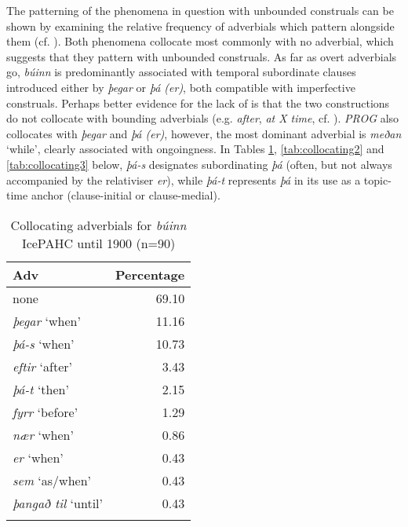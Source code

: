 \documentclass[output=paper,colorlinks,citecolor=brown]{langscibook}
\begin{document}
The patterning of the phenomena in question with unbounded construals can be shown by examining the relative frequency of adverbials which pattern alongside them (cf. \citeauthor{petre2010functions} \citeyear{petre2010functions}). Both phenomena collocate most commonly with no adverbial, which suggests that they pattern with unbounded construals. As far as overt adverbials go, \textit{búinn} is predominantly associated with temporal subordinate clauses introduced either by \textit{þegar} or \textit{þá (er)}, both compatible with imperfective construals. Perhaps better evidence for the lack of  is that the two constructions do not collocate with bounding adverbials (e.g. \textit{after}, \textit{at X time}, cf. \cite[474]{petre2010functions}). \textit{PROG} also collocates with  \textit{þegar} and \textit{þá (er)}, however, the most dominant adverbial is \textit{meðan} `while', clearly associated with ongoingness. In Tables \ref{tab:collocating1}, \ref{tab:collocating2} and \ref{tab:collocating3} below, \textit{þá-s} designates subordinating \textit{þá} (often, but not always accompanied by the relativiser \textit{er}), while \textit{þá-t} represents \textit{þá} in its use as a topic-time anchor (clause-initial or clause-medial).

\begin{table}
    \centering
    \caption{Collocating adverbials for \textit{búinn} IcePAHC until 1900 (n=90)}
    \label{tab:collocating1}
    \begin{tabularx}{0.48\textwidth}{>{\raggedright\arraybackslash}X r}
            \lsptoprule
            Adv & Percentage \\ 
            \midrule
            none & 69.10 \\ 
           \textit{þegar} `when' & 11.16 \\ 
            \textit{þá-s} `when' & 10.73 \\ 
            \textit{eftir} `after' & 3.43 \\ 
            \textit{þá-t} `then' & 2.15 \\ 
            \textit{fyrr} `before' & 1.29 \\ 
            \textit{nær} `when' & 0.86 \\ 
            \textit{er} `when' & 0.43 \\ 
            \textit{sem} `as/when' & 0.43 \\ 
            \textit{þangað til} `until' & 0.43 \\ 
            \lspbottomrule
    \end{tabularx}
\end{table}
\end{document}
